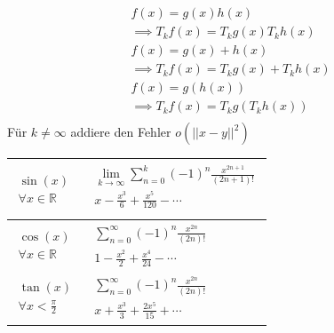     \[\begin{array}{ll}
      f(x)=g(x)h(x) \\\implies T_kf(x)=T_kg(x)T_kh(x)\\
      f(x)=g(x)+h(x) \\\implies T_kf(x)=T_kg(x)+T_kh(x)\\
      f(x)=g(h(x))   \\\implies T_kf(x)=T_kg(T_kh(x))\\
    \end{array} \]
  Für \(k\neq\infty\) addiere den Fehler \(o(||x-y||^2)\)
  \renewcommand{\arraystretch}{1.5}
  \begin{tabular}{|l|l|}
    \hline
    
    $\begin{array}{l}\sin(x)\\\forall x\in\mathbb R\end{array}$ & 
      $\begin{array}{l}
        \lim\limits_{k\rightarrow\infty}\sum_{n=0}^k (-1)^n \frac{x^{2n+1}}{(2n+1)!}\\
        x - \frac{x^3}{6} + \frac{x^5}{120} - \dotsb\\
      \end{array}$\\

    \hline
    
    $\begin{array}{l}\cos(x)\\\forall x\in\mathbb R\end{array}$ &
      $\begin{array}{l}
        \sum_{n=0}^\infty (-1)^n \frac{x^{2n}}{(2n)!}\\
        1 - \frac{x^2}{2} + \frac{x^4}{24} - \dotsb
      \end{array}$\\

    \hline
    
    $\begin{array}{l} \tan(x)\\ \forall x<\frac{\pi}{2}\end{array}$ &
      $\begin{array}{l}
        \sum_{n=0}^\infty (-1)^n \frac{x^{2n}}{(2n)!}\\
        x + \frac{x^3}{3} + \frac{2 x^5}{15} + \dotsb
      \end{array}$\\

    \hline
    

\end{tabular}
